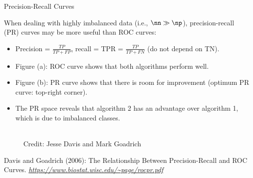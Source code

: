 \documentclass[11pt,compress,t,notes=noshow, xcolor=table]{beamer}
\begin{document}
\begin{vbframe}{Precision-Recall Curves}

\begin{footnotesize}
When dealing with highly imbalanced data (i.e., $\nn \gg \np$), precision-recall (PR) curves may be more useful than ROC curves:

\begin{itemize}
  \item Precision = $\frac{TP}{TP + FP}$, recall = TPR = $\frac{TP}{TP + FN}$ (do not depend on TN).
  \item Figure (a): ROC curve shows that both algorithms perform well.
  \item Figure (b): PR curve shows that there is room for improvement (optimum PR curve: top-right corner).
  \item The PR space reveals that algorithm 2 has an advantage over algorithm 1, which is due to imbalanced classes.
\end{itemize}
\end{footnotesize}
\begin{figure}
    \centering
    \tiny{\\ Credit: Jesse Davis and Mark Goadrich \\}
\end{figure}
{\tiny{Davis and Goadrich (2006): The Relationship Between Precision-Recall and ROC Curves. \emph{\url{https://www.biostat.wisc.edu/~page/rocpr.pdf}}}\par}


\end{vbframe}
\end{document}
